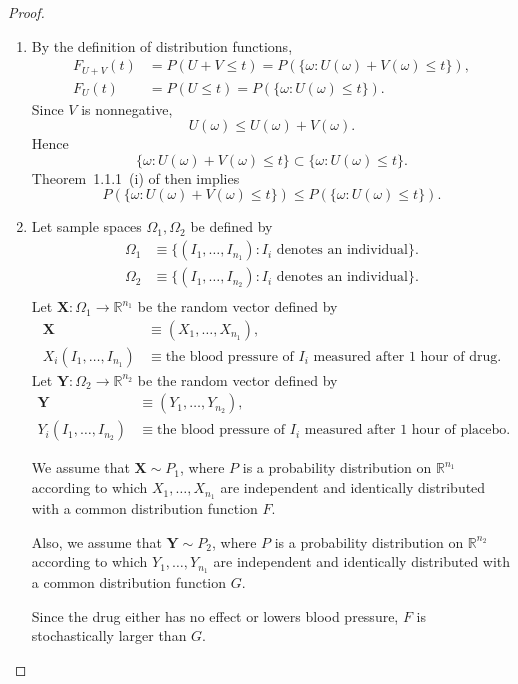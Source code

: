 \documentclass{amsbook}
\theoremstyle{definition}
\theoremstyle{remark}
\numberwithin{section}{chapter}
\numberwithin{equation}{chapter}
\begin{document}
\begin{proof}
\begin{enumerate}[label=(\alph*)]
\item By the definition of distribution functions,\[
\begin{split}
F_{U+V}(t)&=P(U+V\leqslant t)=P(\{\omega:U(\omega)+V(\omega)\leqslant t\}),\\
F_U(t)&=P(U\leqslant t)=P(\{\omega:U(\omega)\leqslant t\}).
\end{split}
\]Since $V$ is nonnegative,\[
U(\omega)\leqslant U(\omega)+V(\omega).
\]Hence\[
\{\omega:U(\omega)+V(\omega)\leqslant t\}\subset\{\omega:U(\omega)\leqslant t\}.
\]Theorem~1.1.1~(i) of \cite{durrett2019probability} then implies\[
P(\{\omega:U(\omega)+V(\omega)\leqslant t\})\leqslant P(\{\omega:U(\omega)\leqslant t\}).
\]
\item Let sample spaces $\Omega_1,\Omega_2$ be defined by\[
\begin{split}
\Omega_1&\equiv\{(I_1,\dots,I_{n_1}):I_i\text{ denotes an individual}\}.\\
\Omega_2&\equiv\{(I_1,\dots,I_{n_2}):I_i\text{ denotes an individual}\}.\\
\end{split}
\]Let $\mathbf{X}:\Omega_1\to\mathbb{R}^{n_1}$ be the random vector defined by\[
\begin{split}
\mathbf{X}&\equiv(X_1,\dots,X_{n_1}),\\
X_i(I_1,\dots,I_{n_1})&\equiv\text{the blood pressure of }I_i\text{ measured after 1 hour of drug}.
\end{split}
\]Let $\mathbf{Y}:\Omega_2\to\mathbb{R}^{n_2}$ be the random vector defined by\[
\begin{split}
\mathbf{Y}&\equiv(Y_1,\dots,Y_{n_2}),\\
Y_i(I_1,\dots,I_{n_2})&\equiv\text{the blood pressure of }I_i\text{ measured after 1 hour of placebo}.
\end{split}
\]

We assume that $\mathbf{X}\sim P_1$, where $P$ is a probability distribution on $\mathbb{R}^{n_1}$ according to which $X_1,\dots,X_{n_1}$ are independent and identically distributed with a common distribution function $F$.

Also, we assume that $\mathbf{Y}\sim P_2$, where $P$ is a probability distribution on $\mathbb{R}^{n_2}$ according to which $Y_1,\dots,Y_{n_1}$ are independent and identically distributed with a common distribution function $G$.

Since the drug either has no effect or lowers blood pressure, $F$ is stochastically larger than $G$.
\end{enumerate}
\end{proof}
\end{document}
